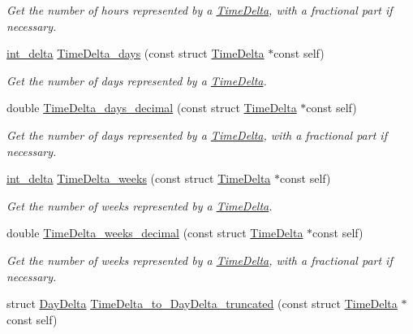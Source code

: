 \begin{DoxyCompactItemize}
\begin{DoxyCompactList}\small\item\em Get the number of hours represented by a \hyperlink{structTimeDelta}{Time\-Delta}, with a fractional part if necessary. \end{DoxyCompactList}\item 
\hyperlink{types_8h_a8a67cf99971c5cfeeaa2380ba84a4c92}{int\-\_\-delta} \hyperlink{time-delta_8h_ae7e2ca9c2f8ce05faf4ba2a207d0e8dd}{Time\-Delta\-\_\-days} (const struct \hyperlink{structTimeDelta}{Time\-Delta} $\ast$const self)
\begin{DoxyCompactList}\small\item\em Get the number of days represented by a \hyperlink{structTimeDelta}{Time\-Delta}. \end{DoxyCompactList}\item 
double \hyperlink{time-delta_8h_a5b79dc42f8fca1ea501e016a24440464}{Time\-Delta\-\_\-days\-\_\-decimal} (const struct \hyperlink{structTimeDelta}{Time\-Delta} $\ast$const self)
\begin{DoxyCompactList}\small\item\em Get the number of days represented by a \hyperlink{structTimeDelta}{Time\-Delta}, with a fractional part if necessary. \end{DoxyCompactList}\item 
\hyperlink{types_8h_a8a67cf99971c5cfeeaa2380ba84a4c92}{int\-\_\-delta} \hyperlink{time-delta_8h_a162a7cec10d82c6cf922a32eb22f58d1}{Time\-Delta\-\_\-weeks} (const struct \hyperlink{structTimeDelta}{Time\-Delta} $\ast$const self)
\begin{DoxyCompactList}\small\item\em Get the number of weeks represented by a \hyperlink{structTimeDelta}{Time\-Delta}. \end{DoxyCompactList}\item 
double \hyperlink{time-delta_8h_a1cf0e7d811b1fd0dd4c50c26d110f30a}{Time\-Delta\-\_\-weeks\-\_\-decimal} (const struct \hyperlink{structTimeDelta}{Time\-Delta} $\ast$const self)
\begin{DoxyCompactList}\small\item\em Get the number of weeks represented by a \hyperlink{structTimeDelta}{Time\-Delta}, with a fractional part if necessary. \end{DoxyCompactList}\item 
struct \hyperlink{structDayDelta}{Day\-Delta} \hyperlink{time-delta_8h_abd089246702cb29504de0fe4e3057ad2}{Time\-Delta\-\_\-to\-\_\-\-Day\-Delta\-\_\-truncated} (const struct \hyperlink{structTimeDelta}{Time\-Delta} $\ast$const self)

\end{DoxyCompactItemize}
